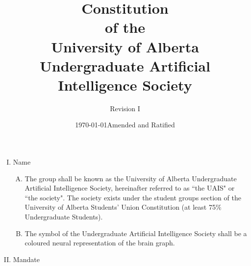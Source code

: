 \documentclass[11pt]{article}
\date{\today}
\title{Constitution \\
of the \\
University of Alberta \\
Undergraduate Artificial Intelligence Society \\
}
\date{Amended and Ratified \thedate}
\author{Revision I}
\begin{document}
\maketitle

\begin{enumerate}[I.]
  \item Name
    \begin{enumerate}[A)]
      \item The group shall be known as the University of Alberta Undergraduate Artificial Intelligence Society, hereinafter referred to as ``the UAIS" or ``the society". The society exists under the student groups section of the University of Alberta Students' Union Constitution (at least 75\% Undergraduate Students).
      \item The symbol of the Undergraduate Artificial Intelligence Society shall be a coloured neural representation of the brain graph.
      \end{enumerate}
  \item Mandate


\end{enumerate}
\end{document}
